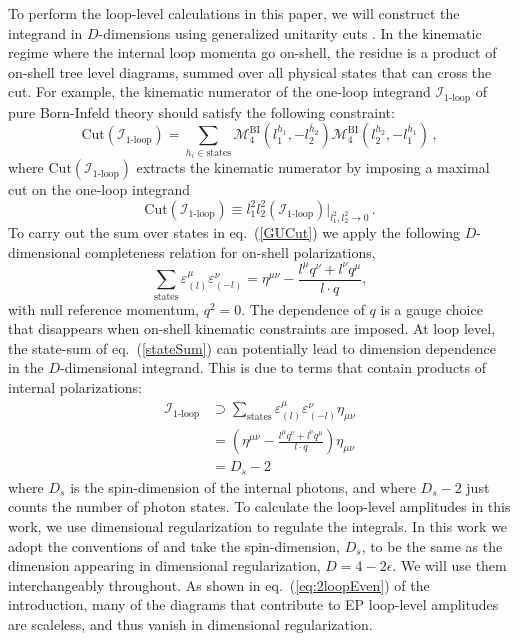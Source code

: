 \documentclass[12pt,letter]{article}
\def\eqn#1{eq.~(\ref{#1})}
\begin{document}
To perform the loop-level calculations in this paper, we will construct the integrand in $D$-dimensions using generalized unitarity cuts \cite{Bern:1995db,Bern:1996ja}. In the kinematic regime where the internal loop momenta go on-shell, the residue is a product of on-shell tree level diagrams, summed over all physical states that can cross the cut. For example, the kinematic numerator of the one-loop integrand $\mathcal{I}_{\text{1-loop}}$ of pure Born-Infeld theory should satisfy the following constraint:
\begin{equation}
\label{GUCut}
\text{Cut}( \mathcal{I}_{\text{1-loop}}) = \sum_{h_i\in \text{states}} \mathcal{M}^{\text{BI}}_4(l_1^{h_1},-l_2^{\bar{h}_2})\mathcal{M}^{\text{BI}}_4(l_2^{h_2},-l_1^{\bar{h}_1})\,,
\end{equation}  
where $\text{Cut}( \mathcal{I}_{\text{1-loop}}) $ extracts the kinematic numerator by imposing a maximal cut on the one-loop integrand 
\begin{equation}
\text{Cut}( \mathcal{I}_{\text{1-loop}})  \equiv l_1^2l_2^2(\mathcal{I}_{\text{1-loop}})\Big|_{l_1^2,l_2^2\rightarrow 0}\,.
\end{equation}
To carry out the sum over states in \eqn{GUCut} we apply the following $D$-dimensional completeness relation for on-shell polarizations,
\begin{equation}\label{stateSum}
\sum_{\text{states}}\varepsilon^\mu_{(l)}\varepsilon^\nu_{(-l)} = \eta^{\mu\nu} - \frac{l^\mu q^\nu+l^\nu q^\mu}{l\cdot q},
\end{equation}
with null reference momentum, $q^2=0$. The dependence of $q$ is a gauge choice that disappears when on-shell kinematic constraints are imposed. At loop level, the state-sum of \eqn{stateSum} can potentially lead to dimension dependence in the $D$-dimensional integrand. This is due to terms that contain products of internal polarizations:
\begin{equation}
\begin{aligned}
 \mathcal{I}_{\text{1-loop}} &\supset \sum_{ \text{states}} \varepsilon^\mu_{(l)}\varepsilon^\nu_{(-l)} \eta_{\mu\nu}
 \\
 &=\left(\eta^{\mu\nu} - \frac{l^\mu q^\nu+l^\nu q^\mu}{l\cdot q}\right) \eta_{\mu\nu}
 \\
 &=D_s-2
 \end{aligned}
\end{equation}
 where $D_s$ is the spin-dimension of the internal photons, and where $D_s-2$ just counts the number of photon states. To calculate the loop-level amplitudes in this work, we use dimensional regularization to regulate the integrals. In this work we adopt the conventions of  \cite{collins_1984,Bern:2002zk} and take the spin-dimension, $D_s$, to be
the same as the dimension appearing in dimensional regularization, $D=4-2\epsilon$. We will use them interchangeably throughout. As shown in \eqn{eq:2loopEven} of the introduction, many of the diagrams that contribute to EP loop-level amplitudes are scaleless, and thus vanish in dimensional regularization. 
\end{document}
